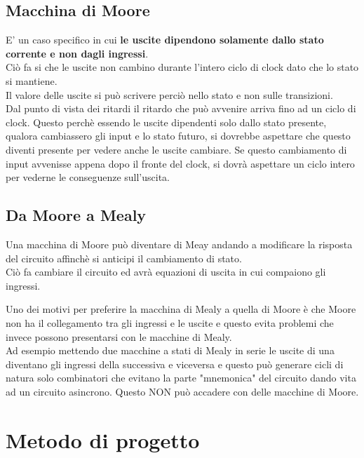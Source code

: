 \documentclass[a4paper]{book}
\begin{document}
\subsection*{Macchina di Moore}
 
E' un caso specifico in cui \textbf{le uscite dipendono solamente dallo stato corrente e non dagli ingressi}.\\
Ciò fa si che le uscite non cambino durante l'intero ciclo di clock dato che lo stato si mantiene.\\
Il valore delle uscite si può scrivere perciò nello stato e non sulle transizioni.\\
Dal punto di vista dei ritardi il ritardo che può avvenire arriva fino ad un ciclo di clock.
Questo perchè essendo le uscite dipendenti solo dallo stato presente, qualora cambiassero gli input e lo stato futuro, si dovrebbe aspettare che questo diventi presente per vedere anche le uscite cambiare.
Se questo cambiamento di input avvenisse appena dopo il fronte del clock, si dovrà aspettare un ciclo intero per vederne le conseguenze sull'uscita.

\subsection*{Da Moore a Mealy}

Una macchina di Moore può diventare di Meay andando a modificare la risposta del circuito affinchè si anticipi il cambiamento di stato.\\
Ciò fa cambiare il circuito ed avrà equazioni di uscita in cui compaiono gli ingressi.

Uno dei motivi per preferire la macchina di Mealy a quella di Moore è che Moore non ha il collegamento tra gli ingressi e le uscite e questo evita problemi che invece possono presentarsi con le macchine di Mealy.\\
Ad esempio mettendo due macchine a stati di Mealy in serie le uscite di una diventano gli ingressi della successiva e viceversa e questo può generare cicli di natura solo combinatori che evitano la parte "mnemonica" del circuito dando vita ad un circuito asincrono.
Questo NON può accadere con delle macchine di Moore.

\section{Metodo di progetto}
\end{document}
